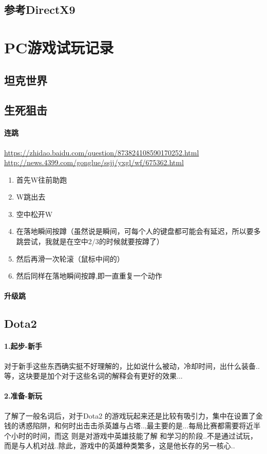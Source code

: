 \documentclass[UTF8,a4paper,8pt]{ctexart}
\begin{document}
	\subsection{参考DirectX9}
	
\newpage
\section{PC游戏试玩记录}
	\subsection{坦克世界}
	
	\subsection{生死狙击}
		\paragraph{连跳}
			\url{https://zhidao.baidu.com/question/873824108590170252.html}
			\url{http://news.4399.com/gonglue/ssjj/yxgl/wf/675362.html}
			\begin{enumerate}
				\item 首先W往前助跑
				\item W跳出去
				\item 空中松开W
				\item 在落地瞬间按蹲（虽然说是瞬间，可每个人的键盘都可能会有延迟，所以要多跳尝试，我就是在空中2/3的时候就要按蹲了）
				\item 然后再滑一次轮滚（鼠标中间的）
				\item 然后同样在落地瞬间按蹲,即一直重复一个动作
			\end{enumerate}

		\paragraph{升级跳}
	
	\subsection{Dota2}
		\paragraph{1.起步-新手} 对于新手这些东西确实挺不好理解的，比如说什么被动，冷却时间，出什么装备..等，这块要是加个对于这些名词的解释会有更好的效果...
		
		\paragraph{2.准备-新玩} 了解了一般名词后，对于Dota2 的游戏玩起来还是比较有吸引力，集中在设置了金钱的诱惑陷阱，和何时出击击杀英雄与占塔..,最主要的是...每局比赛都需要将近半个小时的时间，而这 则是对游戏中英雄技能了解 和学习的阶段..不是通过试玩，而是与人机对战..除此，游戏中的英雄种类繁多，这是他长存的另一核心..
	
\end{document}
